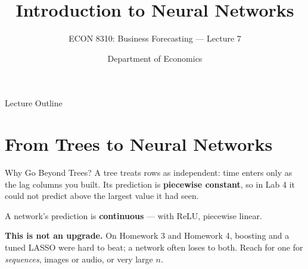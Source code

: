 \documentclass[aspectratio=169, 11pt]{beamer}
\title[Neural Networks]{Introduction to Neural Networks}
\subtitle{ECON 8310: Business Forecasting --- Lecture 7}
\author{Department of Economics}
\institute{University of Nebraska at Omaha}
\begin{document}

\begin{frame}
  \titlepage
\end{frame}

\begin{frame}{Lecture Outline}
  \tableofcontents
\end{frame}

\section{From Trees to Neural Networks}


\begin{frame}{Why Go Beyond Trees?}
  A tree treats rows as independent: time enters only as the lag columns you built. Its
  prediction is \textbf{piecewise constant}, so in Lab 4 it could not predict above the largest
  value it had seen.

  \vspace{0.15cm}
  A network's prediction is \textbf{continuous} --- with ReLU, piecewise linear.

  \begin{warningbox}
    \textbf{This is not an upgrade.} On Homework 3 and Homework 4, boosting and a tuned LASSO were
    hard to beat; a network often loses to both. Reach for one for \emph{sequences}, images or audio,
    or very large $n$.
  \end{warningbox}
\end{frame}
\end{document}
